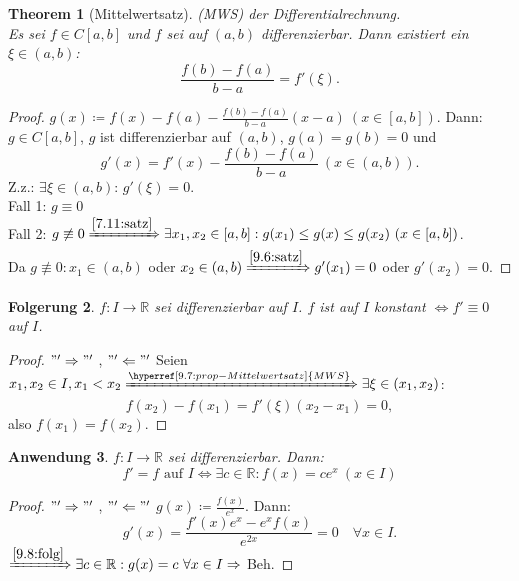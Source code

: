 \documentclass{extreport}
\newcommand{\R}{\mathbb{R}}
\theoremstyle{named}
\newtheorem{namedtheorem}{Theorem} \counterwithin{namedtheorem}{chapter}
\theoremstyle{dotless}
\newtheorem{folgerung}[namedtheorem]{Folgerung}
\newtheorem{anwendung}[namedtheorem]{Anwendung}
\begin{document}
\begin{namedtheorem}[Mittelwertsatz] \label{9.7:prop-Mittelwertsatz}
	(MWS) der Differentialrechnung. \\
	Es sei $f \in C[a, b]$ und $f$ sei auf $(a, b)$ differenzierbar. Dann existiert ein $\xi \in (a, b)$:
	$$ \frac{f(b) - f(a)}{b - a} = f'(\xi). $$
\end{namedtheorem}

\begin{proof}
	$g(x) \coloneqq f(x) - f(a) - \frac{f(b) - f(a)}{b - a} (x - a) ~(x \in [a, b])$. Dann: $g \in C[a, b]$, $g$ ist differenzierbar auf $(a, b)$, $g(a) = g(b) = 0$ und 
		$$ g'(x) = f'(x) - \frac{f(b) - f(a)}{b - a} ~(x \in (a, b)). $$
	Z.z.: $\exists \xi \in (a, b)$: $g'(\xi) = 0$. \\
	Fall 1: $g \equiv 0$ \checkmark \\
	Fall 2: $g \not\equiv 0 \xRightarrow[]{\ref{7.11:satz}} \exists x_{1}, x_{2} \in [a, b]: g(x_{1}) \leq g(x) \leq g(x_{2}) ~(x \in [a, b])$. \\
	Da $g \not\equiv 0: x_{1} \in (a, b)$ oder $x_{2} \in (a, b) \xRightarrow[]{\ref{9.6:satz}} g'(x_{1}) = 0$ oder $g'(x_{2}) = 0$.
\end{proof}


\begin{folgerung} \label{9.8:folg}
	$f \colon I \rightarrow \R$ sei differenzierbar auf $I$. $f$ ist auf $I$ konstant $\iff f' \equiv 0$ auf $I$.	
\end{folgerung}

\begin{proof}
	$"'\Rightarrow"'$ \checkmark, $"'\Leftarrow"'$ Seien $x_{1}, x_{2} \in I, x_{1} < x_{2} \xRightarrow[]{\hyperref[9.7:prop-Mittelwertsatz]{MWS}} \exists \xi \in (x_{1}, x_{2})$: 
		$$ f(x_{2}) - f(x_{1}) = f'(\xi) (x_{2} - x_{1}) = 0, $$ 
	also $f(x_{1}) = f(x_{2})$.
\end{proof}


\begin{anwendung} \label{9.9:anwendung}
	$f \colon I \rightarrow \R$ sei differenzierbar. Dann: 
		$$ f' = f \text{ auf } I \iff \exists c \in \R: f(x) = c e^{x} ~(x \in I) $$
\end{anwendung}

\begin{proof}
	$"'\Rightarrow"'$ \checkmark, $"'\Leftarrow"'$ $g(x) \coloneqq \frac{f(x)}{e^{x}}$. Dann:
	$$ g'(x) = \frac{f'(x) e^{x} - e^{x} f(x)}{e^{2x}} = 0 \quad \forall x \in I. $$
	$\xRightarrow[]{\ref{9.8:folg}} \exists c \in \R: g(x) = c ~\forall x \in I \Rightarrow$ Beh.
\end{proof}
\end{document}
